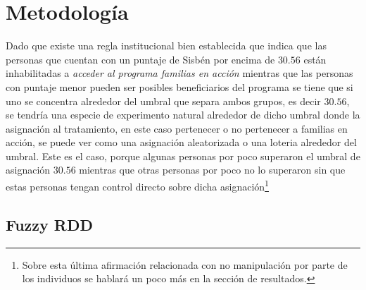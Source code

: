 \documentclass[AER]{AEA}
\begin{document}

\section{Metodología}

Dado que existe una regla institucional bien establecida que indica que las personas que cuentan con un puntaje de Sisbén por encima de $30.56$ están inhabilitadas a \textit{acceder al programa familias en acción} mientras que las personas con puntaje menor pueden ser posibles beneficiarios del programa se tiene que si uno se concentra alrededor del umbral que separa ambos grupos, es decir $30.56$, se tendría una especie de experimento natural alrededor de dicho umbral donde la asignación al tratamiento, en este caso pertenecer o no pertenecer a familias en acción, se puede ver como una asignación aleatorizada o una loteria alrededor del umbral. Este es el caso, porque algunas personas por poco superaron el umbral de asignación $30.56$ mientras que otras personas por poco no lo superaron sin que estas personas tengan control directo sobre dicha asignación\footnote{Sobre esta última afirmación relacionada con no manipulación por parte de los individuos se hablará un poco más en la sección de resultados.}

\subsection{Fuzzy RDD}
\end{document}
